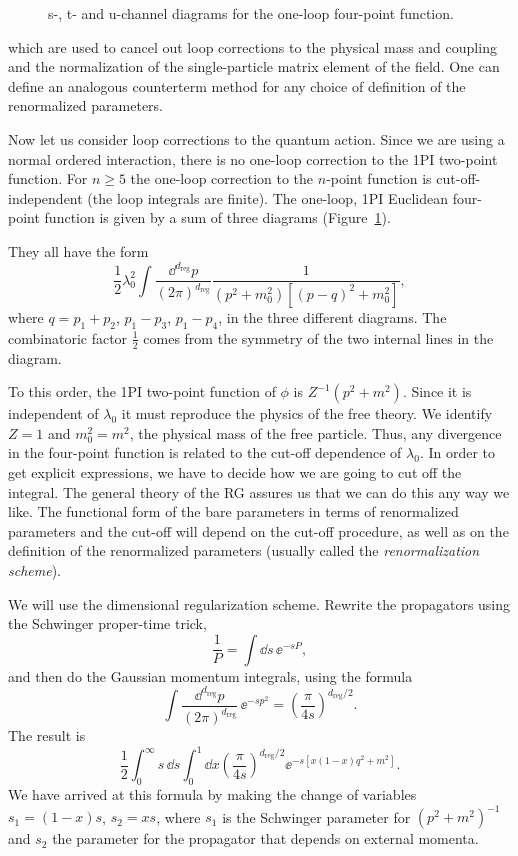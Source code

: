 \begin{figure}[htbp]
  \centering
  
  \caption{s-, t- and u-channel diagrams for the one-loop four-point function.}
  \label{fig:9.4}
\end{figure}

which are used to cancel out loop corrections to the physical mass and coupling
and the normalization of the single-particle matrix element of the field. One
can define an analogous counterterm method for any choice of definition of the
renormalized parameters.

Now let us consider loop corrections to the quantum action. Since we are using a
normal ordered interaction, there is no one-loop correction to the 1PI two-point
function. For $n\geq5$ the one-loop correction to the $n$-point function is
cut-off-independent (the loop integrals are finite). The one-loop, 1PI Euclidean
four-point function is given by a sum of three diagrams (Figure~\ref{fig:9.4}).

They all have the form
\[
  \frac{1}{2}\lambda_0^2\int\frac{\dd^{d_{\mathrm{reg}}}p}{(2\pi)^{d_{\mathrm{reg}}}}
  \frac{1}{(p^2+m_0^2)[(p-q)^2+m_0^2]},
\]
where $q=p_1+p_2$, $p_1-p_3$, $p_1-p_4$, in the three different diagrams. The
combinatoric factor $\frac12$ comes from the symmetry of the two internal lines
in the diagram.

To this order, the 1PI two-point function of $\phi$ is $Z^{-1}(p^2+m^2)$. Since
it is independent of $\lambda_0$ it must reproduce the physics of the free
theory. We identify $Z=1$ and $m_0^2=m^2$, the physical mass of the free
particle. Thus, any divergence in the four-point function is related to the
cut-off dependence of $\lambda_0$. In order to get explicit expressions, we have
to decide how we are going to cut off the integral. The general theory of the RG
assures us that we can do this any way we like. The functional form of the bare
parameters in terms of renormalized parameters and the cut-off will depend on the
cut-off procedure, as well as on the definition of the renormalized parameters
(usually called the \emph{renormalization scheme}).

We will use the dimensional regularization scheme. Rewrite the propagators using
the Schwinger proper-time trick,
\[
  \frac{1}{P}=\int\dd s\,\ee^{-sP},
\]
and then do the Gaussian momentum integrals, using the formula
\[
  \int\frac{\dd^{d_{\mathrm{reg}}}p}{(2\pi)^{d_{\mathrm{reg}}}}\,\ee^{-sp^2}
  =\left(\frac{\pi}{4s}\right)^{d_{\mathrm{reg}}/2}.
\]
The result is
\[
  \frac{1}{2}\int_0^\infty s\,\dd s\int_0^1\dd x
  \left(\frac{\pi}{4s}\right)^{d_{\mathrm{reg}}/2}
  \ee^{-s[x(1-x)q^2+m^2]}.
\]
We have arrived at this formula by making the change of variables
$s_1=(1-x)s$, $s_2=xs$, where $s_1$ is the Schwinger parameter for
$(p^2+m^2)^{-1}$ and $s_2$ the parameter for the propagator that depends on
external momenta.

